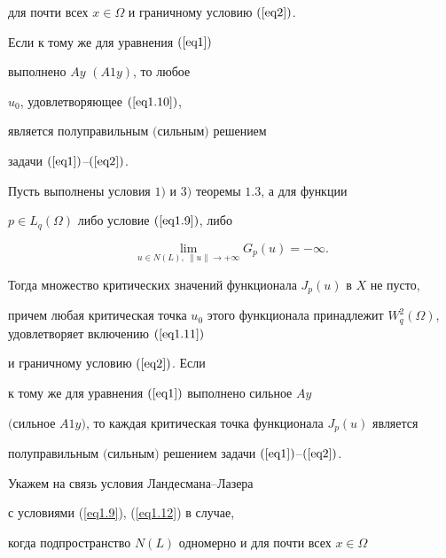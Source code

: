\begin{thms}
\begin{equation}
\end{equation}


для почти всех $x\in \Omega$ и граничному условию $(\ref{eq2})$.


Если к тому же для уравнения $(\ref{eq1})$


выполнено $Ay $ $(A1y)$, то любое


$u_0$, удовлетворяющее $(\ref{eq1.10})$,


является полуправильным $($сильным$)$ решением


задачи $(\ref{eq1})$--$(\ref{eq2})$.


\end{thms}





\begin{thms}


Пусть выполнены условия $1)$ и $3)$ теоремы $1.3$, а для функции


$p\in L_q(\Omega )$ либо условие $(\ref{eq1.9})$, либо


\begin{equation}


\lim\limits_{u \in N(L),\ \| u\| \to +\infty }G_p(u)=-\infty .


\label{eq1.12}


\end{equation}


Тогда множество критических значений функционала $J_p(u)$ в $X$ не пусто,


причем любая критическая точка $u_0$ этого функционала принадлежит $W_{q}^{2}


(\Omega)$, удовлетворяет включению $(\ref{eq1.11})$


и граничному условию $(\ref{eq2})$. Если


к тому же для уравнения $(\ref{eq1})$ выполнено сильное $Ay$


$($сильное $A1y)$, то каждая критическая точка функционала $J_p(u)$ является


полуправильным $($сильным$)$ решением задачи $(\ref{eq1})$--$(\ref{eq2})$.


\end{thms}





Укажем на связь условия Ландесмана--Лазера


\cite{n3} с условиями (\ref{eq1.9}), (\ref{eq1.12}) в случае,


когда подпространство $N(L)$ одномерно и для почти всех $x\in \Omega$


